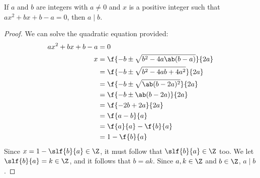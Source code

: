 \begin{lemma}
	If \(a\) and \(b\) are integers with \(a \neq 0\) and \(x\) is a positive integer such that
	\(ax^2 + bx + b - a = 0\), then \(a \mid b\).
\end{lemma}
\begin{proof}
	We can solve the quadratic equation provided:
	\begin{align*}
		ax^2 + bx + b - a & = 0                                              \\
		x                 & = \f{ -b \pm \sqrt{b^2 - 4 a \ab(b - a)} }{ 2a } \\
		                  & = \f{ -b \pm \sqrt{b^2 - 4ab + 4a^2} }{ 2a }     \\
		                  & = \f{ -b \pm \sqrt{\ab(b - 2a)^2} }{ 2a }        \\
		                  & = \f{ -b \pm \ab(b - 2a) }{2a}                   \\
		                  & = \f{-2b + 2a}{2a}                               \\
		                  & = \f{a - b}{a}                                   \\
		                  & = \f{a}{a} - \f{b}{a}                            \\
		                  & = 1 - \f{b}{a}
	\end{align*}
	Since \(x = 1 - \slf{b}{a} \in \Z\), it must follow that \(\slf{b}{a} \in \Z\)
	too. We let \(\slf{b}{a} = k \in \Z\), and it follows that \(b = ak\).
	Since \(a, k \in \Z\) and \(b \in \Z\), \(a \mid b\).
\end{proof}
